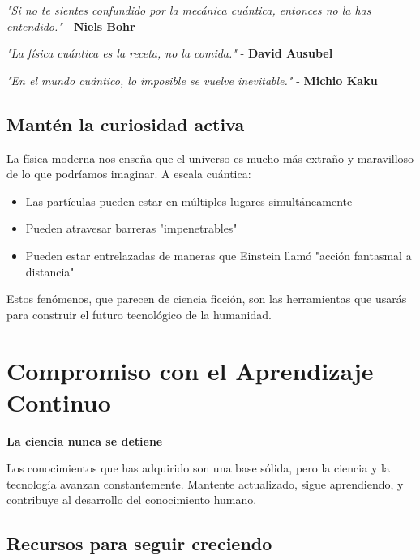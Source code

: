 \begin{tecnologiabox}
\begin{tecnologiabox}
\begin{tecnologiabox}
\begin{teknologiabox}
\begin{tcolorbox}[colback=uteqblue!10!white,colframe=uteqblue,title=Reflexiones de Grandes Científicos]
	\textit{"Si no te sientes confundido por la mecánica cuántica, entonces no la has entendido."} - \textbf{Niels Bohr}
	
	\textit{"La física cuántica es la receta, no la comida."} - \textbf{David Ausubel}
	
	\textit{"En el mundo cuántico, lo imposible se vuelve inevitable."} - \textbf{Michio Kaku}
\end{tcolorbox}

\subsection{Mantén la curiosidad activa}

La física moderna nos enseña que el universo es mucho más extraño y maravilloso de lo que podríamos imaginar. A escala cuántica:

\begin{itemize}
	\item Las partículas pueden estar en múltiples lugares simultáneamente
	\item Pueden atravesar barreras "impenetrables" 
	\item Pueden estar entrelazadas de maneras que Einstein llamó "acción fantasmal a distancia"
\end{itemize}

Estos fenómenos, que parecen de ciencia ficción, son las herramientas que usarás para construir el futuro tecnológico de la humanidad.

\section{Compromiso con el Aprendizaje Continuo}

\begin{notabox}
	\textbf{La ciencia nunca se detiene}
	
	Los conocimientos que has adquirido son una base sólida, pero la ciencia y la tecnología avanzan constantemente. Mantente actualizado, sigue aprendiendo, y contribuye al desarrollo del conocimiento humano.
\end{notabox}

\subsection{Recursos para seguir creciendo}


\end{teknologiabox}
\end{tecnologiabox}
\end{tecnologiabox}
\end{tecnologiabox}
